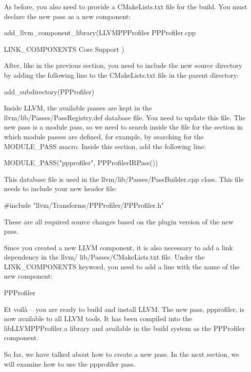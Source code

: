 As before, you also need to provide a CMakeLists.txt file for the build. You must declare the new pass as a new component:

\begin{cmake}
add_llvm_component_library(LLVMPPProfiler
    PPProfiler.cpp

    LINK_COMPONENTS
    Core
    Support
)
\end{cmake}

After, like in the previous section, you need to include the new source directory by adding the following line to the CMakeLists.txt file in the parent directory:

\begin{cmake}
add_subdirectory(PPProfiler)
\end{cmake}

Inside LLVM, the available passes are kept in the llvm/lib/Passes/PassRegistry.def database file. You need to update this file. The new pass is a module pass, so we need to search inside the file for the section in which module passes are defined, for example, by searching for the MODULE\_PASS macro. Inside this section, add the following line:

\begin{shell}
MODULE_PASS("ppprofiler", PPProfilerIRPass())
\end{shell}

This database file is used in the llvm/lib/Passes/PassBuilder.cpp class. This file needs to include your new header file:

\begin{cpp}
#include "llvm/Transforms/PPProfiler/PPProfiler.h"
\end{cpp}

These are all required source changes based on the plugin version of the new pass.

Since you created a new LLVM component, it is also necessary to add a link dependency in the llvm/ lib/Passes/CMakeLists.txt file. Under the LINK\_COMPONENTS keyword, you need to add a line with the name of the new component:

\begin{shell}
PPProfiler
\end{shell}

Et voilà – you are ready to build and install LLVM. The new pass, ppprofiler, is now available to all LLVM tools. It has been compiled into the libLLVMPPProfiler.a library and available in the build system as the PPProfiler component.

So far, we have talked about how to create a new pass. In the next section, we will examine how to use the ppprofiler pass.









